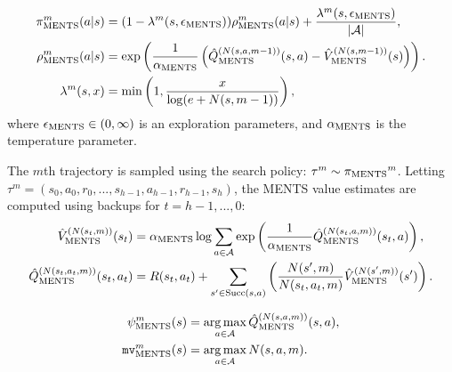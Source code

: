         \begin{align}
            {\pi^{m}_{{\textnormal{MENTS}}}}(a|s) &= (1-{\lambda^{m}(s,{\epsilon_{{\textnormal{MENTS}}}})}){\rho^{m}_{{\textnormal{MENTS}}}}(a|s) + \frac{{\lambda^{m}(s,{\epsilon_{{\textnormal{MENTS}}}})}}{|\mathcal{A}|}, 
                        \label{appeq:ments_soft_policy} \\ 
            {\rho^{m}_{{\textnormal{MENTS}}}}(a|s) &= \exp\left(
                \frac{1}{{\alpha_{{\textnormal{MENTS}}}}}\left({\hat{Q}^{(N(s,a,m-1))}_{{\textnormal{MENTS}}}}(s,a)-{\hat{V}^{(N(s,m-1))}_{{\textnormal{MENTS}}}}(s)\right)\right). \\
            \lambda^m(s,x) &= \min\left(1, \frac{x}{\log(e+N(s,m-1))}\right),
        \end{align}
        where ${\epsilon_{{\textnormal{MENTS}}}}\in(0,\infty)$ is an exploration parameters, and ${\alpha_{{\textnormal{MENTS}}}}$ is the temperature parameter. 

        The $m$th trajectory is sampled using the search policy: $\tau^m \sim {\pi_{{\textnormal{MENTS}}}}^m$. Letting $\tau^m=(s_0,a_0,r_0,...,s_{h-1},a_{h-1},r_{h-1},s_{h})$, the MENTS value estimates are computed using backups for $t=h-1, ..., 0$: 
        \begin{align}
            {\hat{V}^{(N(s_t,m))}_{{\textnormal{MENTS}}}}(s_t) &= 
                {\alpha_{{\textnormal{MENTS}}}} \log \sum_{a\in\mathcal{A}} \exp \left(
                    \frac{1}{{\alpha_{{\textnormal{MENTS}}}}}{\hat{Q}^{(N(s_t,a,m))}_{{\textnormal{MENTS}}}}(s_t,a) \right), \label{appeq:soft_v_backup} \\
            {\hat{Q}^{(N(s_t,a_t,m))}_{{\textnormal{MENTS}}}}(s_t,a_t) &= 
                R(s_t,a_t) + \sum_{s'\in{\textnormal{Succ}(s,a)}} \left( 
                    \frac{N(s',m)}{N(s_t,a_t,m)} {\hat{V}^{(N(s',m))}_{{\textnormal{MENTS}}}}(s') \right). \label{appeq:soft_q_backup}
        \end{align}


        \begin{align}
            \psi^{m}_{{\textnormal{MENTS}}}(s) &= \operatorname*{arg\,max}_{a\in\mathcal{A}}{\hat{Q}^{(N(s,a,m))}_{{\textnormal{MENTS}}}}(s,a), \\
            {\texttt{mv}^{m}_{{\textnormal{MENTS}}}}(s) &= \operatorname*{arg\,max}_{a\in\mathcal{A}} N(s,a,m).
        \end{align}










